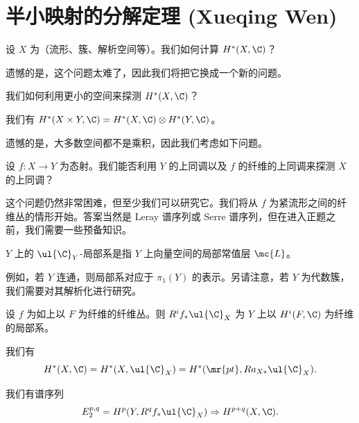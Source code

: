 \section{半小映射的分解定理 (Xueqing Wen)}%
\label{sec:Decomposition theorem for semi-small maps (Xueqing Wen)}

\begin{quest}
    设 \(X\) 为（流形、簇、解析空间等）。我们如何计算 \(H^*(X, \C)\)？
\end{quest}

遗憾的是，这个问题太难了，因此我们将把它换成一个新的问题。

\begin{quest}
    我们如何利用更小的空间来探测 \(H^*(X, \C)\)？
\end{quest}

\begin{thm}
    我们有 \(H^*(X \times Y, \C) = H^*(X, \C) \otimes H^*(Y, \C)\)。
\end{thm}

遗憾的是，大多数空间都不是乘积，因此我们考虑如下问题。

\begin{quest}
    设 \(f \colon X \to Y\) 为态射。我们能否利用 \(Y\) 的上同调以及 \(f\) 的纤维的上同调来探测 \(X\) 的上同调？
\end{quest}

这个问题仍然非常困难，但至少我们可以研究它。我们将从 \(f\) 为紧流形之间的纤维丛的情形开始。答案当然是 Leray 谱序列或 Serre 谱序列，但在进入正题之前，我们需要一些预备知识。

\begin{defn}
    \(Y\) 上的 \(\ul{\C}_Y\)-局部系是指 \(Y\) 上向量空间的局部常值层 \(\mc{L}\)。
\end{defn}

例如，若 \(Y\) 连通，则局部系对应于 \(\pi_1(Y)\) 的表示。另请注意，若 \(Y\) 为代数簇，我们需要对其解析化进行研究。

\begin{exm}
    设 \(f\) 为如上以 \(F\) 为纤维的纤维丛。则 \(R^i f_* \ul{\C}_X\) 为 \(Y\) 上以 \(H^i(F, \C)\) 为纤维的局部系。
\end{exm}

\begin{prop}
    我们有
    \[ H^*(X, \C) = H^*(X, \ul{\C}_X) = H^*(\mr{pt}, R a_{X*} \ul{\C}_X). \]
\end{prop}

\begin{thm}
    我们有谱序列
    \[ E_2^{p,q} = H^p(Y, R^q f_* \ul{\C}_X) \Rightarrow H^{p+q}(X, \C). \]
\end{thm}

